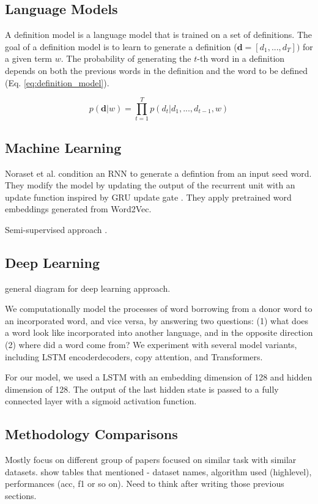 \subsection{Language Models}
A definition model is a language model that is trained on a set of definitions.
The goal of a definition model is to learn to generate a definition %
($\textbf{d} = [d_1, ..., d_T])$ for a given term $w$. The probability of
generating the $t$-th word in a definition depends on both the previous words in
the definition and the word to be defined (Eq. \ref{eq:definition_model}).

\begin{equation}
    \label{eq:definition_model}
    p(\textbf{d} | w) = \prod_{t=1}^{T} p(d_t | d_1,...,d_{t-1}, w)
\end{equation}

\subsection{Machine Learning}
Noraset et al. condition an RNN to generate a defintion from an input seed word.
They modify the model by updating the output of the recurrent unit with an
update function inspired by GRU update gate \cite{noraset_definition_2016}. They
apply pretrained word embeddings generated from Word2Vec.

Semi-supervised approach \cite{patra_bilingual_2019}.

\subsection{Deep Learning}
general diagram for deep learning approach.

\cite{wu_2021_sequence}We computationally model the processes of
word borrowing from a donor word to an incorporated
word, and vice versa, by answering
two questions: (1) what does a word look
like incorporated into another language, and
in the opposite direction (2) where did a word
come from? We experiment with several
model variants, including LSTM encoderdecoders,
copy attention, and Transformers.

\cite{wu_computational_2020} For our model, we used a LSTM with an embedding
dimension of 128 and hidden dimension of 128.
The output of the last hidden state is passed to a fully connected layer with a sigmoid activation function.

\subsection{Methodology Comparisons}
Mostly focus on different group of papers focused on similar task with similar
datasets. show tables that mentioned - dataset names, algorithm used
(highlevel), performances (acc, f1 or so on). Need to think after writing those
previous sections.

